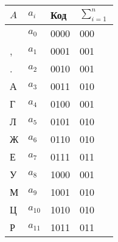 \begin{tabular}{llll}
\toprule
$A$ & $a_i$ & Код & $\sum_{i=1}^{n}$ \\
\midrule
  & $a_{0}$ & 0000 & 000 \\
, & $a_{1}$ & 0001 & 001 \\
. & $a_{2}$ & 0010 & 001 \\
А & $a_{3}$ & 0011 & 010 \\
Г & $a_{4}$ & 0100 & 001 \\
Л & $a_{5}$ & 0101 & 010 \\
Ж & $a_{6}$ & 0110 & 010 \\
Е & $a_{7}$ & 0111 & 011 \\
У & $a_{8}$ & 1000 & 001 \\
М & $a_{9}$ & 1001 & 010 \\
Ц & $a_{10}$ & 1010 & 010 \\
Р & $a_{11}$ & 1011 & 011 \\
\bottomrule
\end{tabular}
